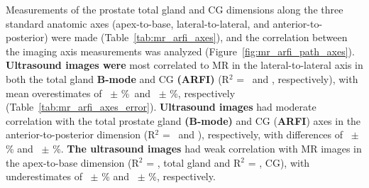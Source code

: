 Measurements of the prostate total gland and CG dimensions along the three
standard anatomic axes (apex-to-base, lateral-to-lateral, and
anterior-to-posterior) were made (Table~\ref{tab:mr_arfi_axes}), and the
correlation between the imaging axis measurements was analyzed
(Figure~\ref{fig:mr_arfi_path_axes}). \textbf{Ultrasound images were} most
correlated to MR in the lateral-to-lateral axis in both the total gland
\textbf{B-mode} and CG \textbf{(ARFI)} (R$^2$ = \totalLatLatRsq~and
\centralLatLatRsq, respectively), with mean overestimates of
\ARFImrTotalLatLatMeanPct~$\pm$ \ARFImrTotalLatLatStdPct\%~and
\ARFImrCentralLatLatMeanPct~$\pm$ \ARFImrCentralLatLatStdPct\%, respectively
(Table~\ref{tab:mr_arfi_axes_error}).  \textbf{Ultrasound images} had moderate
correlation with the total prostate gland \textbf{(B-mode)} and CG
(\textbf{ARFI}) axes in the anterior-to-posterior dimension (R$^2$ =
\totalAntPostRsq~and \centralAntPostRsq), respectively, with differences of
\ARFImrTotalAntPostMeanPct~$\pm$ \ARFImrTotalAntPostStdPct\% and
\ARFImrCentralAntPostMeanPct~$\pm$ \ARFImrCentralAntPostStdPct\%.  \textbf{The
ultrasound images} had weak correlation with MR images in the apex-to-base
dimension (R$^2$ = \totalApexBaseRsq, total gland and R$^2$ =
\centralApexBaseRsq, CG), with underestimates of
\ARFImrTotalApexBaseMeanPct~$\pm$ \ARFImrTotalApexBaseStdPct\% and
\ARFImrCentralApexBaseMeanPct~$\pm$ \ARFImrCentralApexBaseStdPct\%,
respectively.





%

%

%
